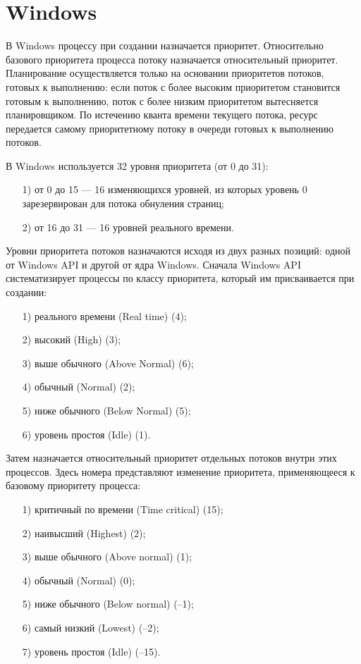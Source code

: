 \documentclass{bmstu}
\begin{document}
\section{Windows}

В Windows процессу при создании назначается приоритет. 
Относительно базового приоритета процесса потоку назначается относительный приоритет. 
Планирование осуществляется только на основании приоритетов потоков, готовых к выполнению: если поток с более высоким приоритетом становится готовым к выполнению, поток с более низким приоритетом вытесняется планировщиком. 
По истечению кванта времени текущего потока, ресурс передается самому приоритетному потоку в очереди готовых к выполнению потоков.

В Windows используется 32 уровня приоритета (от 0 до 31):
\begin{enumerate}
\item[1)] от 0 до 15 --- 16 изменяющихся уровней, из которых уровень 0 зарезервирован для потока обнуления страниц;
\item[2)] от 16 до 31 --- 16 уровней реального времени.
\end{enumerate}

Уровни приоритета потоков назначаются исходя из двух разных позиций: одной от Windows API и другой от ядра Windows. 
Сначала Windows API систематизирует процессы по классу приоритета, который им присваивается при создании:
\begin{enumerate}
\item[1)] реального времени (Real time) (4);
\item[2)] высокий (High) (3);
\item[3)] выше обычного (Above Normal) (6);
\item[4)] обычный (Normal) (2);
\item[5)] ниже обычного (Below Normal) (5);
\item[6)] уровень простоя (Idle) (1).
\end{enumerate}

Затем назначается относительный приоритет отдельных потоков внутри этих процессов. 
Здесь номера представляют изменение приоритета, применяющееся к базовому приоритету процесса:
\begin{enumerate}
\item[1)] критичный по времени (Time critical) (15);
\item[2)] наивысший (Highest) (2);
\item[3)] выше обычного (Above normal) (1);
\item[4)] обычный (Normal) (0);
\item[5)] ниже обычного (Below normal) (–1);
\item[6)] самый низкий (Lowest) (–2);
\item[7)] уровень простоя (Idle) (–15).
\end{enumerate}
\end{document}
